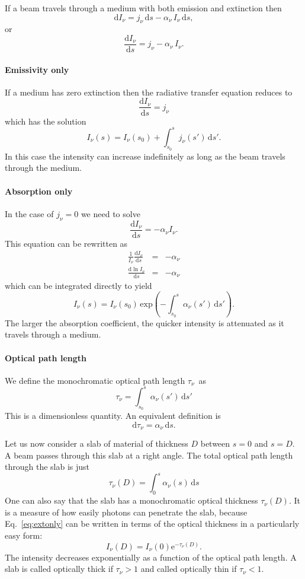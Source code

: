 \documentclass[12pt]{article}
\numberwithin{equation}{section}
\def\exp{\mathrm{e}}
\def\dd{\mathrm{d}}
\def\Inu{\ensuremath{I_{\nu}}}
\def\jnu{\ensuremath{j_{\nu}}}
\def\anu{\ensuremath{\alpha_{\nu}}}
\def\taunu{\ensuremath{\tau_{\nu}}}
\def\ds{\ensuremath{\dd s}}
\newcommand{\be}{\begin{equation}}
\newcommand{\ee}{\end{equation}}
\newcommand{\bea}{\begin{eqnarray}}
\newcommand{\eea}{\end{eqnarray}}
\begin{document}
If a beam travels through a medium with both emission and extinction then
\be
\dd \Inu = \jnu \, \ds - \anu \, \Inu \, \ds,
\ee
or
\be
\frac{\dd \Inu}{\ds} = \jnu  - \anu \, \Inu.
\ee

\paragraph{Emissivity only} 
If a medium has zero extinction then the radiative transfer equation reduces to 
\be
\frac{\dd \Inu}{\ds} = \jnu 
\ee
which has the solution
\be
\Inu(s) = \Inu(s_0) + \int_{s_0}^{s} \jnu(s') \, \dd s'.
\ee
In this case the intensity can increase indefinitely as long as the beam travels through the medium.

\paragraph{Absorption only} 
In the case of $\jnu=0$ we need to solve
\be
\frac{\dd \Inu}{\ds} = - \anu \Inu.
\ee
This equation can be rewritten as
\bea
\frac{1}{\Inu} \frac{\dd \Inu}{\ds} &=& - \anu  \nonumber \\
\frac{\dd  \ln{\Inu} }{\ds} &=&  - \anu \nonumber 
\eea
which can be integrated directly to yield
\be \label{eq:extonly}
\Inu(s) = \Inu(s_0) \, \mathrm{exp} \left(-\int_{s_0}^s \anu(s') \, \dd s'\right).
\ee
The larger the absorption coefficient, the quicker intensity is attenuated as it travels through a medium.

\paragraph{Optical path length} We define the monochromatic optical path length \taunu\ as
\be
\taunu = \int_{s_0}^s \anu(s') \, \dd s'
\ee
This is a dimensionless quantity. An equivalent definition is
\be
\dd \taunu =  \anu\, \ds.
\ee

Let us now consider a slab of material of thickness $D$ between $s=0$ and $s=D$. A beam passes through this slab at a right angle. The total optical path length through the slab is just
\be
\taunu(D) = \int_{0}^s \anu(s) \, \dd s
\ee
One can also say that the slab has a monochromatic optical thickness $\taunu(D)$. It is a measure of how easily photons can penetrate the slab, because Eq.~\ref{eq:extonly} can be written in terms of the optical thickness in a particularly easy form:
\be
\Inu(D) = \Inu(0) \exp^{-\taunu(D)}.
\ee
The intensity decreases exponentially as a function of the optical path length. A slab is called optically thick if $\taunu >1$ and called optically thin if $\taunu <1$.
\end{document}
